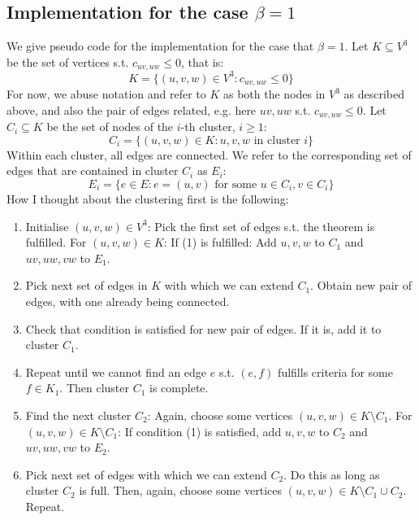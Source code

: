  


\subsection{Implementation for the case $\beta=1$}
We give pseudo code for the implementation for the case that $\beta=1$. Let $K \subseteq V^3$ be the set of vertices s.t. $c_{uv,uw} \leq 0$, that is: \[ K=\{(u,v,w) \in V^3: c_{uv,uw} \leq 0\} \] For now, we abuse notation and refer to $K$ as both the nodes in $V^3$ as described above, and also the pair of edges related, e.g. here $uv, uw$ s.t. $c_{uv,uw} \leq 0$. 
Let $C_i \subseteq K$ be the set of nodes of the $i$-th cluster, $i \geq 1$:
\[C_i = \{(u,v,w) \in K: u,v,w \text{ in cluster } i \} \]
Within each cluster, all edges are connected. We refer to the corresponding set of edges that are contained in cluster $C_i$ as $E_i$:
\[ E_i= \{ e \in E: e=(u,v) \text{ for some } u \in C_i, v \in C_i \} \]
How I thought about the clustering first is the following: 
\begin{enumerate}
    \item Initialise $(u,v,w) \in V^3$: Pick the first set of edges s.t. the theorem is fulfilled. For $(u,v,w) \in K$: If (1) is fulfilled: Add $u,v,w$ to $C_1$ and $uv,uw,vw$ to $E_1$. 
\item Pick next set of edges in $K$ with which we can extend $C_1$. Obtain new pair of edges, with one already being connected. 
\item Check that condition is satisfied for new pair of edges. If it is, add it to cluster $C_1$. \item Repeat until we cannot find an edge $e$ s.t. $(e,f)$ fulfills criteria for some $f \in K_1$. Then cluster $C_1$ is complete. 
\item Find the next cluster $C_2$: Again, choose some vertices $(u,v,w) \in K\setminus C_1$. For $(u,v,w) \in K \setminus C_1$: 
If condition (1) is satisfied, add $u,v,w$ to $C_2$ and $uv,uw,vw$ to $E_2$. 
\item Pick next set of edges with which we can extend $C_2$. Do this as long as cluster $C_2$ is full. Then, again, choose some vertices $(u,v,w) \in K \setminus C_1 \cup C_2$. Repeat. 
\end{enumerate}

